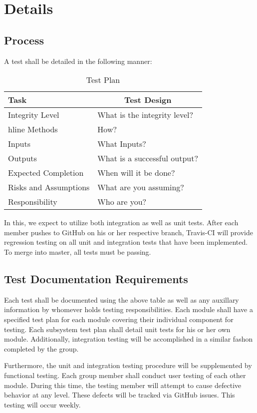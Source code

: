 \documentclass[]{article}
\begin{document}
\section{Details}
\subsection{Process}
A test shall be detailed in the following manner:
\begin{table}[H]
	\centering
	\caption{Test Plan}
	\label{my-label}
	\begin{tabular}{|l|l|}
		\hline
		Task & \multicolumn{1}{c|}{Test Design} \\ \hline
		Integrity Level & What is the integrity level? \\hline
		Methods & How? \\ \hline
		Inputs &  What Inputs? \\ \hline
		Outputs &  What is a successful output?\\ \hline
		Expected Completion & When will it be done?\\ \hline
		Risks and Assumptions & What are you assuming?\\ \hline
		Responsibility & Who are you?\\ \hline
	\end{tabular}
\end{table}
In this, we expect to utilize both integration as well as unit tests. After each member pushes to GitHub on his or her respective branch, Travis-CI will provide regression testing on all unit and integration tests that have been implemented. To merge into master, all tests must be passing. 

\subsection{Test Documentation Requirements}
Each test shall be documented using the above table as well as any auxillary information by whomever holds testing responsibilities. Each module shall have a specified test plan for each module covering their individual component for testing. Each subsystem test plan shall detail unit tests for his or her own module. Additionally, integration testing will be accomplished in a similar fashon completed by the group.

Furthermore, the unit and integration testing procedure will be supplemented by functional testing. Each group member shall conduct user testing of each other module. During this time, the testing member will attempt to cause defective behavior at any level. These defects will be tracked via GitHub issues. This testing will occur weekly.
\end{document}
